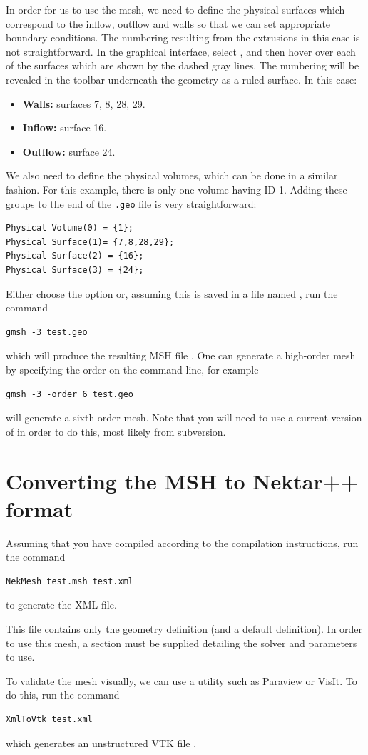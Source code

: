 In order for us to use the mesh, we need to define the physical surfaces which
correspond to the inflow, outflow and walls so that we can set appropriate
boundary conditions. The numbering resulting from the extrusions in this case is
not straightforward. In the graphical interface, select , and then hover over each of the surfaces
which are shown by the dashed gray lines. The numbering will be revealed in the
toolbar underneath the geometry as a ruled surface. In this case:
%
\begin{itemize}
\item \textbf{Walls:} surfaces 7, 8, 28, 29.
\item \textbf{Inflow:} surface 16.
\item \textbf{Outflow:} surface 24.
\end{itemize}
%
We also need to define the physical volumes, which can be done in a similar
fashion. For this example, there is only one volume having ID 1. Adding these
groups to the end of the \texttt{.geo} file is very straightforward:

\begin{lstlisting}[style=XmlStyle]
Physical Volume(0) = {1};
Physical Surface(1)= {7,8,28,29};
Physical Surface(2) = {16};
Physical Surface(3) = {24};
\end{lstlisting}
Either choose the option  or, assuming this is saved in
a file named , run the command
\begin{lstlisting}[style=BashInputStyle]
gmsh -3 test.geo
\end{lstlisting}
which will produce the resulting MSH file . One can generate a
high-order mesh by specifying the order on the command line, for example
\begin{lstlisting}[style=BashInputStyle]
gmsh -3 -order 6 test.geo
\end{lstlisting}
will generate a sixth-order mesh. Note that you will need to use a current
version of \gmsh in order to do this, most likely from subversion.

\section{Converting the MSH to Nektar++ format}
Assuming that you have compiled \nekpp according to the compilation
instructions, run the command
%
\begin{lstlisting}[style=BashInputStyle]
NekMesh test.msh test.xml
\end{lstlisting}
%
to generate the XML file.
%
\begin{notebox}
  This file contains only the geometry definition (and a default
   definition). In order to use this mesh, a
   section must be supplied detailing the solver and
  parameters to use.
\end{notebox}
%
To validate the mesh visually, we can use a utility such as Paraview or
VisIt. To do this, run the command
%
\begin{lstlisting}[style=BashInputStyle]
XmlToVtk test.xml
\end{lstlisting}
%
which generates an unstructured VTK file .


